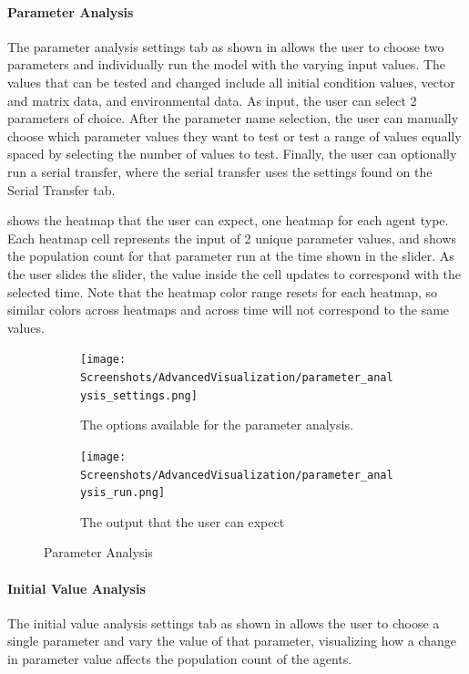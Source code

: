 \paragraph{Parameter Analysis}
\label{sec:parameter_analysis}
The parameter analysis settings tab as shown in  allows the user to choose two parameters and individually run the model with the varying input values.
The values that can be tested and changed include all initial condition values, vector and matrix data, and environmental data.
As input, the user can select 2 parameters of choice.
After the parameter name selection, the user can manually choose which parameter values they want to test or test a range of values equally spaced by selecting the number of values to test.
Finally, the user can optionally run a serial transfer, where the serial transfer uses the settings found on the Serial Transfer tab. 

 shows the heatmap that the user can expect, one heatmap for each agent type.
Each heatmap cell represents the input of 2 unique parameter values, and shows the population count for that parameter run at the time shown in the slider. 
As the user slides the slider, the value inside the cell updates to correspond with the selected time. 
Note that the heatmap color range resets for each heatmap, so similar colors across heatmaps and across time will not correspond to the same values.

\begin{figure}[!ht]
    \centering
    \begin{subfigure}{0.49\linewidth}
        \centering
        \captionsetup{width=1\linewidth}
        \texttt{[image: Screenshots/AdvancedVisualization/parameter\_analysis\_settings.png]}
        \caption{
            The options available for the parameter analysis. 
        }
        \label{fig:ss:av:parameter_analysis_settings}
    \end{subfigure}
    \hfill
    \begin{subfigure}{0.49\linewidth}
        \centering
        \captionsetup{width=1\linewidth}
        \texttt{[image: Screenshots/AdvancedVisualization/parameter\_analysis\_run.png]}
        \caption{
            The output that the user can expect
        }
        \label{fig:ss:av:parameter_analysis_run}
    \end{subfigure}
    \caption{Parameter Analysis}
\end{figure}


\paragraph{Initial Value Analysis}
\label{sec:initial_value_analysis}
The initial value analysis settings tab as shown in  allows the user to choose a single parameter and vary the value of that parameter, visualizing how a change in parameter value affects the population count of the agents.

